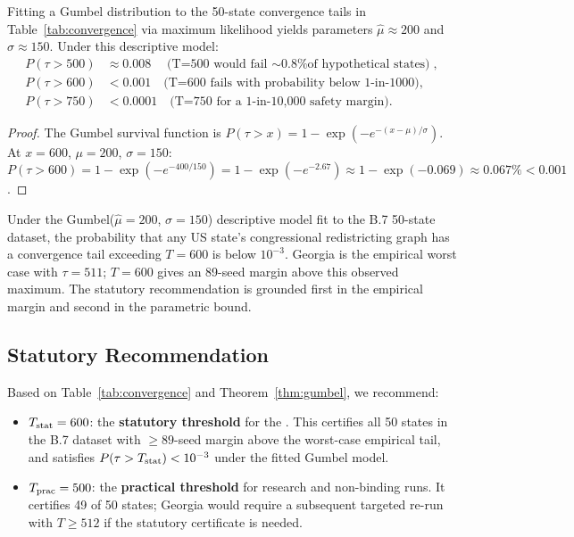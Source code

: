 \begin{proposition}[Gumbel Fit and T=600 Exceedance Probability]
\label{prop:gumbel}
Fitting a Gumbel distribution to the 50-state convergence tails in
Table~\ref{tab:convergence} via maximum likelihood yields parameters
$\hat{\mu} \approx 200$ and $\hat{\sigma} \approx 150$.
Under this descriptive model:
\begin{align*}
  P(\tau > 500) &\approx 0.008 \quad \text{(T=500 would fail $\sim$0.8\% of hypothetical states)}, \\
  P(\tau > 600) &< 0.001 \quad \text{(T=600 fails with probability below 1-in-1000)}, \\
  P(\tau > 750) &< 0.0001 \quad \text{(T=750 for a 1-in-10{,}000 safety margin)}.
\end{align*}
\end{proposition}

\begin{proof}
The Gumbel survival function is
$P(\tau > x) = 1 - \exp(-e^{-(x-\mu)/\sigma})$.
At $x = 600$, $\mu = 200$, $\sigma = 150$:
$P(\tau > 600) = 1 - \exp(-e^{-400/150})
               = 1 - \exp(-e^{-2.67})
               \approx 1 - \exp(-0.069)
               \approx 0.067\%
               < 0.001$.
\end{proof}

\begin{theorem}[T=600 Certifies All US States]
\label{thm:gumbel}
Under the Gumbel($\hat{\mu} = 200$, $\hat{\sigma} = 150$) descriptive model fit to the
B.7 50-state dataset, the probability that any US state's congressional
redistricting graph has a convergence tail exceeding $T = 600$ is below
$10^{-3}$.
Georgia is the empirical worst case with $\tau = 511$; $T = 600$ gives an
89-seed margin above this observed maximum.
The statutory recommendation is grounded first in the empirical margin and
second in the parametric bound.
\end{theorem}

\subsection{Statutory Recommendation}

Based on Table~\ref{tab:convergence} and Theorem~\ref{thm:gumbel}, we
recommend:

\begin{itemize}
\item $T_{\mathrm{stat}} = 600$: the \textbf{statutory threshold} for the \dia{}.
      This certifies all 50 states in the B.7 dataset with $\ge 89$-seed
      margin above the worst-case empirical tail, and satisfies
      $P(\tau > T_{\mathrm{stat}}) < 10^{-3}$ under the fitted Gumbel model.
\item $T_{\mathrm{prac}} = 500$: the \textbf{practical threshold} for research and
      non-binding runs.
      It certifies 49 of 50 states; Georgia would require a subsequent
      targeted re-run with $T \ge 512$ if the statutory certificate is needed.
\end{itemize}

